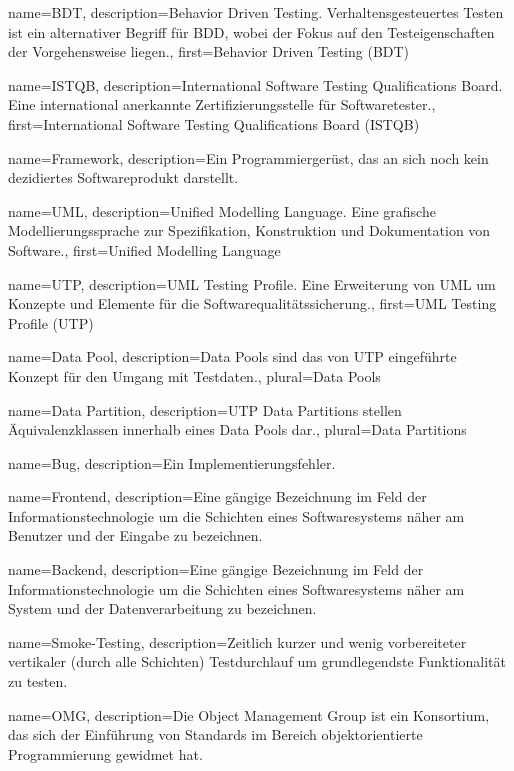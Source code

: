  {
	name={BDT},
	description={Behavior Driven Testing. Verhaltensgesteuertes Testen ist ein alternativer Begriff für BDD, wobei der Fokus auf den Testeigenschaften der Vorgehensweise liegen.},
	first={Behavior Driven Testing (BDT)}
}

 {
	name={ISTQB},
	description={International Software Testing Qualifications Board. Eine international anerkannte Zertifizierungsstelle für Softwaretester.},
	first={International Software Testing Qualifications Board (ISTQB)}
}

 {
	name={Framework},
	description={Ein Programmiergerüst, das an sich noch kein dezidiertes Softwareprodukt darstellt.}
}

 {
	name={UML},
	description={Unified Modelling Language. Eine grafische Modellierungssprache zur Spezifikation, Konstruktion und Dokumentation von Software.},
	first={Unified Modelling Language}
}

 {
	name={UTP},
	description={UML Testing Profile. Eine Erweiterung von UML um Konzepte und Elemente für die Softwarequalitätssicherung.},
	first={UML Testing Profile (UTP)}
}

 {
	name={Data Pool},
	description={Data Pools sind das von UTP eingeführte Konzept für den Umgang mit Testdaten.},
	plural={Data Pools}
}

 {
	name={Data Partition},
	description={UTP Data Partitions stellen Äquivalenzklassen innerhalb eines Data Pools dar.},
	plural={Data Partitions}
}

 {
	name={Bug},
	description={Ein Implementierungsfehler.}
}

 {
	name={Frontend},
	description={Eine gängige Bezeichnung im Feld der Informationstechnologie um die Schichten eines Softwaresystems näher am Benutzer und der Eingabe zu bezeichnen.}
}

 {
	name={Backend},
	description={Eine gängige Bezeichnung im Feld der Informationstechnologie um die Schichten eines Softwaresystems näher am System und der Datenverarbeitung zu bezeichnen.}
}


 {
	name={Smoke-Testing},
	description={Zeitlich kurzer und wenig vorbereiteter vertikaler (durch alle Schichten) Testdurchlauf um grundlegendste Funktionalität zu testen.}
}

 {
	name={OMG},
	description={Die Object Management Group ist ein Konsortium, das sich der Einführung von Standards im Bereich objektorientierte Programmierung gewidmet hat.}
}